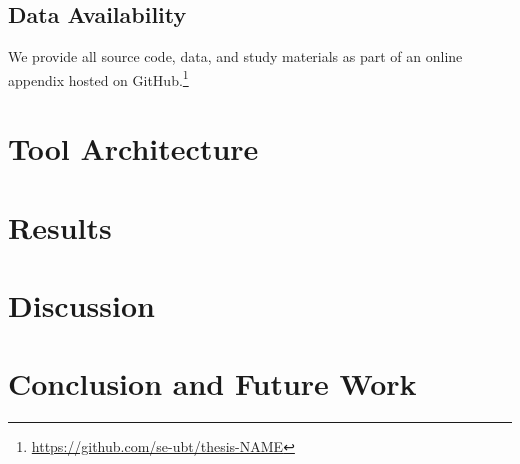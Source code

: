 \lipsum[1-4]

\section{Data Availability}
\label{sec:data-availability}

We provide all source code, data, and study materials as part of an online appendix hosted on GitHub.\footnote{\url{https://github.com/se-ubt/thesis-NAME}}


\chapter{Tool Architecture}
\label{ch:tool-architecture}

\lipsum[1-4]

\chapter{Results}
\label{ch:results}

\lipsum[1-4]

\chapter{Discussion}
\label{ch:discussion}

\lipsum[1-4]

\chapter{Conclusion and Future Work}
\label{ch:conclusion}

\lipsum[1-4]

\listoffigures
 
\listoftables




